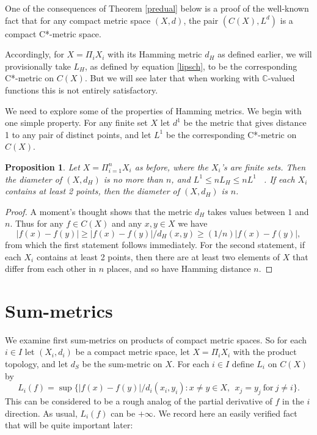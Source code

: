 \documentclass{amsart}[14pt]
\newtheorem{proposition}[theorem]{Proposition}
\theoremstyle{definition}
\theoremstyle{remark}
\newcommand{\bC}{{\mathbb C}}
\newcommand{\<}{\langle}
\renewcommand{\>}{\rangle}
\numberwithin{equation}{section}
\begin{document}
{One of the consequences of Theorem \ref{predual} below
is a proof of the well-known fact that
for any compact 
metric space $(X,d)$, the pair $(C(X), L^d)$
is a compact C*-metric space.
 
 Accordingly, for $X = \Pi_i X_i$ with its
 Hamming metric $d_H$ as defined earlier, we will
 provisionally take $L_H$,
as defined by equation \ref{lipsch}, to
 be the corresponding C*-metric on $C(X)$.
 But we will see later that when working with $\bC$-valued
 functions this is not entirely satisfactory.
 
 We need to explore some of the properties of Hamming metrics. 
 We begin with one simple property. For any
 finite set $X$ let $d^1$ be the metric that gives distance 1
 to any pair of distinct points, and let $L^1$ be the
 corresponding C*-metric on $C(X)$.
 
 \begin{proposition}
 \label{bound}
 Let $X = \Pi_{ i= 1}^n X_i$ as before, where the $X_i$'s
 are finite sets.
 Then the diameter of $(X, d_H)$ is no more than $n$, and
$ L^1 \leq nL_H \leq nL^1$ \ . If each $X_i$ contains at
least 2 points, then the diameter of $(X, d_H)$ is $n$.
 \end{proposition}
 
 \begin{proof}
 A moment's thought shows that the metric $d_H$
 takes values between $1$ and $n$. Thus for
 any $f\in C(X)$ and any $x, y \in X$ we have
 \[
  |f(x) - f(y)| \geq |f(x) - f(y)|/d_H(x,y)  \geq (1/n) |f(x) - f(y)|   ,
 \]
 from which the first statement follows immediately. For
 the second statement, if each $X_i$ contains at least 2
 points, then there are at least two elements of $X$ that
 differ from each other in $n$ places, and so have
 Hamming distance $n$.  
 \end{proof} 
 

\section{Sum-metrics}
\label{sump}

We examine first
sum-metrics on products of compact metric spaces.
So for each $i \in I$ let $(X_i, d_i)$ be a compact
metric space, let  $X = \Pi_i X_i$ with the product topology, 
and let $d_S$
be the sum-metric on $X$. For each $i \in I$
define $L_i$ on $C(X)$ by
\begin{equation}
\label{partial}
L_i(f) = \sup \{|f(x) - f(y)|/d_i(x_i,y_i): x \neq y\in X, \ \ x_j 
=  y_j \  \mathrm{for} \ j \neq i\}.
\end{equation}
This can be considered to be a rough analog of the partial
derivative of $f$ in the $i$ direction. As usual, $L_i(f)$
can be $+\infty$. We record here an easily verified fact that
will be quite important later:

}
\end{document}
